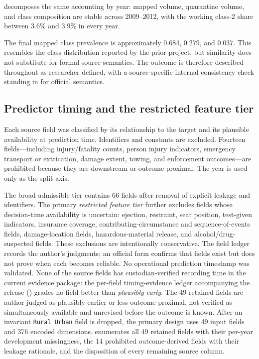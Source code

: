 \documentclass[11pt,letterpaper]{article}
\newcommand{\artifact}[1]{\begingroup\urlstyle{tt}\path{#1}\endgroup}
\begin{document}
 decomposes the same accounting by year: mapped volume, quarantine volume, and class composition are stable across 2009--2012, with the working class-2 share between 3.6\% and 3.9\% in every year.



The final mapped class prevalence is approximately 0.684, 0.279, and 0.037. This resembles the class distribution reported by the prior project, but similarity does not substitute for formal source semantics. The outcome is therefore described throughout as researcher defined, with a source-specific internal consistency check standing in for official semantics.

\subsection{Predictor timing and the restricted feature tier}
\label{sec:features}
Each source field was classified by its relationship to the target and its plausible availability at prediction time. Identifiers and constants are excluded. Fourteen fields---including injury/fatality counts, person injury indicators, emergency transport or extrication, damage extent, towing, and enforcement outcomes---are prohibited because they are downstream or outcome-proximal. The year is used only as the split axis.

The broad admissible tier contains 66 fields after removal of explicit leakage and identifiers. The primary \emph{restricted feature tier} further excludes fields whose decision-time availability is uncertain: ejection, restraint, seat position, test-given indicators, insurance coverage, contributing-circumstance and sequence-of-events fields, damage-location fields, hazardous-material release, and alcohol/drug-suspected fields. These exclusions are intentionally conservative. The field ledger records the author's judgments; an official form confirms that fields exist but does not prove when each becomes reliable. No operational prediction timestamp was validated. None of the source fields has custodian-verified recording time in the current evidence package: the per-field timing-evidence ledger accompanying the release (\artifact{paper/FEATURE_TIMING_EVIDENCE.md}) grades no field better than \emph{plausibly early}. The 49 retained fields are author judged as plausibly earlier or less outcome-proximal, not verified as simultaneously available and unrevised before the outcome is known. After an invariant \texttt{Rural Urban} field is dropped, the primary design uses 49 input fields and 376 encoded dimensions.  enumerates all 49 retained fields with their per-year development missingness, the 14 prohibited outcome-derived fields with their leakage rationale, and the disposition of every remaining source column.
\end{document}
